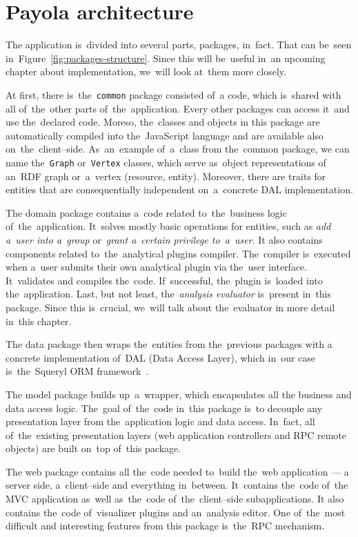 \section{Payola architecture}
The application is~divided into several parts, packages, in~fact. That can be~seen in~Figure~\ref{fig:packages-structure}. Since this will be~useful in~an upcoming
chapter about implementation, we~will look at~them more closely.

At first, there is~the~\texttt{common} package consisted of~a code, which is~shared with all of~the~other parts of~the~application. Every other packages can 
access it~and use the~declared code. Moreso, the~classes and objects 
in this package are automatically compiled into the~JavaScript language and are available
also on~the~client--side. As~an~example of~a~class from the~common package, we
can name the~\texttt{Graph} or~\texttt{Vertex} classes, which serve as~object representations
of an~RDF graph or~a~vertex (resource, entity). Moreover, there are traits for 
entities that are consequentially independent on~a~concrete DAL implementation.

The domain package contains a~code related to~the~business logic of~the~application. It~solves mostly basic operations for entities, such as
\emph{add a~user into a~group} or~\emph{grant a~certain privilege to~a~user}.
It also contains components related to~the~analytical plugins compiler. The~compiler is~executed when a~user submits their own analytical plugin via the~user 
interface. It~validates and compiles the~code. If~successful, the~plugin is~loaded into the~application. Last, but not least, the~\emph{analysis evaluator} is~present in~this package. Since this is~crucial, we~will talk about the~evaluator
in more detail in~this chapter.

The data package then wraps the~entities from the~previous packages with a
concrete implementation of~DAL (Data Access Layer), which in~our case is~the~Squeryl
ORM framework~\cite{squeryl}.

The model package builds up~a~wrapper, which encapsulates all the
business and data access logic. The~goal of~the~code in~this package is~to decouple
any presentation layer from the~application logic and data access. In~fact,
all of~the~existing presentation layers (web application controllers and
RPC remote objects) are built on~top of~this package. 

The web package contains all the~code needed to~build the~web application --- 
a server side, a~client--side and everything in~between. It~contains the~code of~the MVC application as~well as~the~code of~the~client--side subapplications.
It also contains the~code of~visualizer plugins and an~analysis editor. One of~the~most difficult and interesting features from this package is~the~RPC mechanism.

